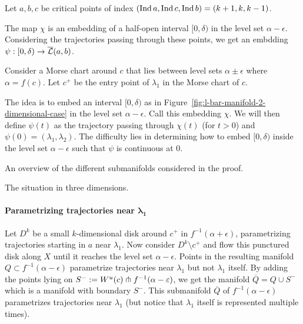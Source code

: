 \begin{myproof}
    Let $a,b,c$ be critical points of index $(\operatorname{Ind} a, \operatorname{Ind} c, \operatorname{Ind} b) = (k+1,k,k-1)$.
    \begin{marginfigure}
        \centering
        \caption{The map $\chi$ is an embedding of a half-open interval $[0, \delta)$ in the level set $\alpha- \epsilon$. Considering the trajectories passing through these points, we get an embdding $\psi: [0, \delta) \to \overline{\mathcal L}(a, b)$.}
        \label{fig:l-bar-manifold-2-dimensional-case}
    \end{marginfigure}
    Consider a Morse chart around $c$ that lies between level sets $\alpha \pm \epsilon$ where  $\alpha = f(c)$.
    Let $c^{+}$ be the entry point of $\lambda_1$ in  the Morse chart of $c$.

    The idea is to embed an interval $[0, \delta)$ as in Figure~\ref{fig:l-bar-manifold-2-dimensional-case} in the level set $\alpha - \epsilon$. Call this embedding $\chi$.
    We will then define $\psi(t)$ as the trajectory passing through $\chi(t)$ (for $t>0$) and  $\psi(0) = (\lambda_1, \lambda_2)$.
    The difficulty lies in determining how to embed $[0, \delta)$ inside the level set $\alpha - \epsilon$ such that $\psi$ is continuous at  $0$.
    \begin{marginfigure}
        \centering
        \caption{An overview of the different submanifolds considered in the proof.}
        \label{fig:l-bar-manifold-2-dimensional-case-part-flow}
    \end{marginfigure}
\begin{marginfigure}
    \centering
    \caption{The situation in three dimensions.}
    \label{fig:lbar-manifold-three-dimensional-case}
\end{marginfigure}

\paragraph{Parametrizing trajectories near $\bm{\lambda_1}$}
Let $D^{k}$ be a small $k$-dimensional disk around $c^{+}$ in $f^{-1}(\alpha+\epsilon)$, parametrizing trajectories starting in $a$ near $\lambda_1$.
    Now consider $D^{k} \setminus c^{+}$ and flow this punctured disk along $X$ until it reaches the level set  $\alpha - \epsilon$.
    Points in the resulting manifold $Q \subset f^{-1}(\alpha - \epsilon)$ parametrize trajectories near $\lambda_1$ but not $\lambda_1$ itself.
    By adding the points lying on $S^{-} := W^u(c) \pitchfork f^{-1}(\alpha - \varepsilon)$, we get the manifold $\overline{Q} = Q \cup S^{-}$ which is a manifold with boundary $S^{-}$.
    This submanifold $\overline{Q}$ of $f^{-1}(\alpha-\epsilon)$ parametrizes trajectories near $\lambda_1$ (but notice that $\lambda_1$ itself is represented multiple times).



\end{myproof}
